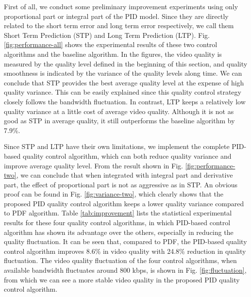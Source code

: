 \documentclass[journal]{IEEEtran}
\begin{document}
First of all, we conduct some preliminary improvement experiments using only proportional part or integral part of the PID model. Since they are directly related to the short term error and long term error respectively, we call them Short Term Prediction (STP) and Long Term Prediction (LTP). Fig. \ref{fig:performance-all} shows the experimental results of these two control algorithms and the baseline algorithm. In the figures, the video quality is measured by the quality level defined in the beginning of this section, and quality smoothness is indicated by the variance of the quality levels along time. We can conclude that STP provides the best average quality level at the expense of high quality variance. This can be easily explained since this quality control strategy closely follows the bandwidth fluctuation. In contrast, LTP keeps a relatively low quality variance at a little cost of average video quality. Although it is not as good as STP in average quality, it still outperforms the baseline algorithm by 7.9\%.

Since STP and LTP have their own limitations, we implement the complete PID-based quality control algorithm, which can both reduce quality variance and improve average quality level. From the result shown in Fig. \ref{fig:performance-two}, we can conclude that when integrated with integral part and derivative part, the effect of proportional part is not as aggressive as in STP. An obvious proof can be found in Fig. \ref{fig:variance-two}, which clearly shows that the proposed PID quality control algorithm keeps a lower quality variance compared to PDF algorithm. Table \ref{tab:improvement} lists the statistical experimental results for these four quality control algorithms, in which PID-based control algorithm has shown its advantage over the others, especially in reducing the quality fluctuation. It can be seen that, compared to PDF, the PID-based quality control algorithm improves 8.6\% in video quality with 24.8\% reduction in quality fluctuation. The video quality fluctuation of the four control algorithms, when available bandwidth fluctuates around 800 kbps, is shown in Fig. \ref{fig:fluctuation}, from which we can see a more stable video quality in the proposed PID quality control algorithm.
\end{document}
